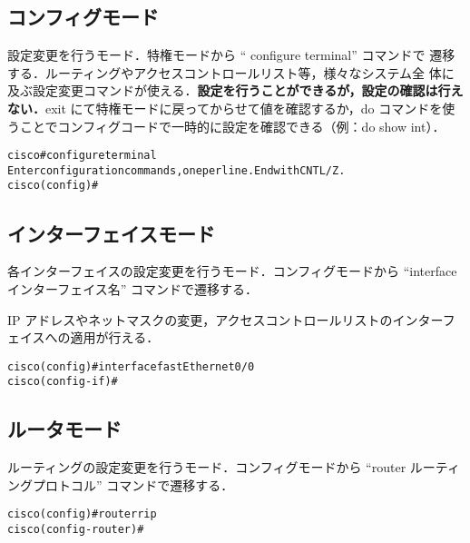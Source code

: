 \subsection*{コンフィグモード}

設定変更を行うモード．特権モードから `` configure terminal'' コマンドで
遷移する．ルーティングやアクセスコントロールリスト等，様々なシステム全
体に及ぶ設定変更コマンドが使える．\textbf{設定を行うことができるが，設定の確認は行えない．}exit にて特権モードに戻ってからせて値を確認するか，do コマンドを使うことでコンフィグコードで一時的に設定を確認できる（例：do show int）．

\begin{center}
\begin{screen}
\begin{alltt}
cisco#configure terminal
Enter configuration commands, one per line.  End with CNTL/Z.
cisco(config)#
\end{alltt}
\end{screen}
\end{center}

\subsection*{インターフェイスモード}

各インターフェイスの設定変更を行うモード．コンフィグモードから
``interface インターフェイス名'' コマンドで遷移する．

IP アドレスやネットマスクの変更，アクセスコントロールリストのインターフェイスへの適用が行える．

\begin{center}
\begin{screen}
\begin{alltt}
cisco(config)#interface fastEthernet 0/0
cisco(config-if)#
\end{alltt}
\end{screen}
\end{center}

\subsection*{ルータモード}

ルーティングの設定変更を行うモード．コンフィグモードから
``router ルーティングプロトコル'' コマンドで遷移する．

\begin{center}
\begin{screen}
\begin{alltt}
cisco(config)#router rip
cisco(config-router)#
\end{alltt}
\end{screen}
\end{center}

